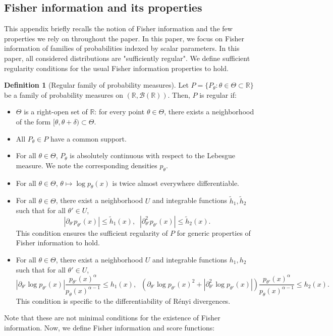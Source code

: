 \documentclass{article}
\theoremstyle{plain}
\theoremstyle{definition}
\newtheorem{definition}[theorem]{Definition}
\theoremstyle{remark}
\begin{document}
\subsection{Fisher information and its properties}
\label{app:Fisher-properties}
This appendix briefly recalls the notion of Fisher information and the few properties we rely on throughout the paper. In this paper, we focus on Fisher information of families of probabilities indexed by scalar parameters. In this paper, all considered distributions are "sufficiently regular". We define sufficient regularity conditions for the usual Fisher information properties to hold.
\begin{definition}[Regular family of probability measures]
\label{defi:regularity}
     Let $P = \{P_\theta : \theta\in\Theta \subset \mathbb{R}\}$ be a family of probability measures on $(\mathbb{R},\mathcal{B}(\mathbb{R}))$. Then, $P$ is regular if:
     \begin{itemize}
         \item $\Theta$ is a right-open set of $\mathbb{R}$: for every point $\theta \in \Theta$, there exists a neighborhood of the form $[\theta,\theta + \delta) \subset \Theta$.
         \item All $P_\theta \in P$ have a common support.
         \item For all $\theta \in \Theta$, $P_\theta$ is absolutely continuous with respect to the Lebesgue measure. We note the corresponding densities $p_\theta$.
         \item For all $\theta \in \Theta$, $\theta \mapsto \log p_\theta(x)$ is twice almost everywhere differentiable.
         \item For all $\theta \in \Theta$,  there exist a neighborhood $U$ and integrable functions $\tilde h_1, \tilde h_2$ such that for all $\theta' \in U$, \[\left|\partial_{\theta'} p_{\theta'}(x)\right| \leq \tilde h_1(x), \;\; \left|\partial_{\theta'}^2 p_{\theta'}(x)\right| \leq \tilde h_2(x).\]
         This condition ensures the sufficient regularity of $P$ for generic properties of Fisher information to hold.
         \item For all $\theta \in \Theta$,  there exist a neighborhood $U$ and integrable functions $h_1, h_2$ such that for all $\theta' \in U$, \[\left|\partial_{\theta'}\log p_{\theta'}(x)\right|\frac{p_{\theta'}(x)^\alpha}{p_{\theta}(x)^{\alpha-1}} \leq h_1(x), \;\; \left(\partial_{\theta'} \log p_{\theta'} (x)^2 +\left| \partial_{\theta'}^2\log p_{\theta'}(x)\right|\right)\frac{p_{\theta'}(x)^\alpha}{p_{\theta}(x)^{\alpha-1}} \leq h_2(x).\]
         This condition is specific to the differentiability of Rényi divergences.
     \end{itemize}
\end{definition}
Note that these are not minimal conditions for the existence of Fisher information. Now, we define Fisher information and score functions:
\end{document}
